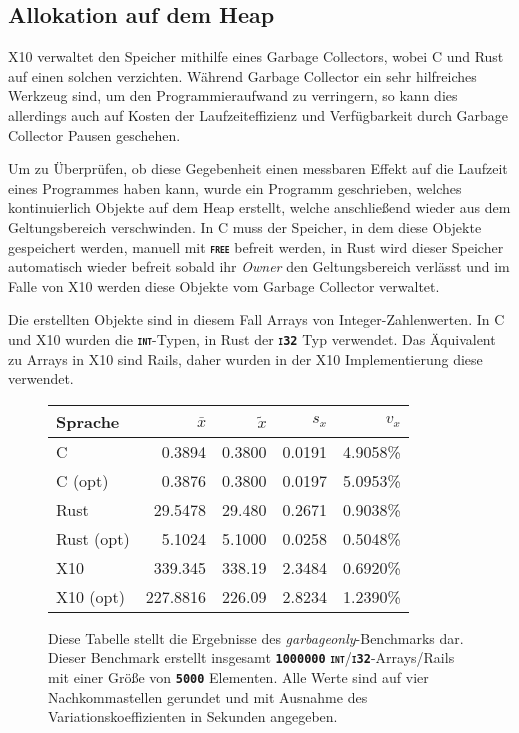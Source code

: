 \FloatBarrier

\subsection{Allokation auf dem Heap}

X10 verwaltet den Speicher mithilfe eines Garbage Collectors, wobei C und Rust auf einen solchen verzichten.
Während Garbage Collector ein sehr hilfreiches Werkzeug sind, um den Programmieraufwand zu verringern, so kann dies
allerdings auch auf Kosten der Laufzeiteffizienz und Verfügbarkeit durch Garbage Collector Pausen geschehen.

Um zu Überprüfen, ob diese Gegebenheit einen messbaren Effekt auf die Laufzeit eines Programmes haben kann,
wurde ein Programm geschrieben, welches kontinuierlich Objekte auf dem Heap erstellt,
welche anschließend wieder aus dem Geltungsbereich verschwinden.
In C muss der Speicher, in dem diese Objekte gespeichert werden, manuell mit \texttt{\textsc{\textbf{free}}}
befreit werden, in Rust wird dieser Speicher automatisch wieder befreit sobald ihr \textit{Owner} den
Geltungsbereich verlässt und im Falle von X10 werden diese Objekte vom Garbage Collector verwaltet.

Die erstellten Objekte sind in diesem Fall Arrays von Integer-Zahlenwerten. In C und X10 wurden die
\texttt{\textsc{\textbf{int}}}-Typen, in Rust der \texttt{\textsc{\textbf{i32}}} Typ verwendet. 
Das Äquivalent zu Arrays in X10 sind Rails, daher wurden in der X10 Implementierung diese verwendet.

\begin{figure}[hb]
	\begin{center}
		\begin{tabular}{lrrrr}
			\toprule
			Sprache    & $\bar{x}$ & $\tilde{x}$ & $s_x$ & $v_x$ \\
			\midrule
			C          & 0.3894   & 0.3800 & 0.0191 & 4.9058\%  \\
			C (opt)    & 0.3876   & 0.3800 & 0.0197 & 5.0953\%  \\
			Rust       & 29.5478  & 29.480 & 0.2671 & 0.9038\%  \\
			Rust (opt) & 5.1024   & 5.1000 & 0.0258 & 0.5048\%  \\
			X10        & 339.345  & 338.19 & 2.3484 & 0.6920\%  \\
			X10 (opt)  & 227.8816 & 226.09 & 2.8234 & 1.2390\%  \\
			\bottomrule
		\end{tabular}
	\end{center}
	\caption{
		Diese Tabelle stellt die Ergebnisse des \textit{garbageonly}-Benchmarks dar. Dieser Benchmark erstellt insgesamt
		\texttt{\textsc{\textbf{1000000}}} \texttt{\textsc{\textbf{int}}}/\texttt{\textsc{\textbf{i32}}}-Arrays/Rails
		mit einer Größe von \texttt{\textsc{\textbf{5000}}} Elementen.
		Alle Werte sind auf vier Nachkommastellen gerundet und mit Ausnahme des Variationskoeffizienten
		in Sekunden angegeben.
	}
	\label{fig:garbageonly_table}
\end{figure}

